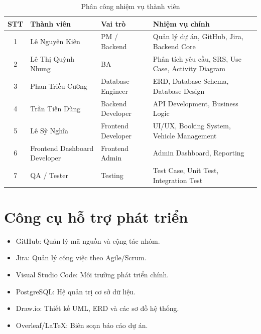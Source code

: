 \begin{table}[H]
\centering
\caption{Phân công nhiệm vụ thành viên}
\label{tab:assignment}
\small
\begin{tabular}{|c|l|l|p{6cm}|}
\hline
\textbf{STT} &
\textbf{Thành viên} &
\textbf{Vai trò} &
\textbf{Nhiệm vụ chính}
\\ \hline

1 &
Lê Nguyên Kiên &
PM / Backend &
Quản lý dự án, GitHub, Jira, Backend Core
\\ \hline

2 &
Lê Thị Quỳnh Nhung &
BA &
Phân tích yêu cầu, SRS, Use Case, Activity Diagram
\\ \hline

3 &
Phan Triều Cường &
Database Engineer &
ERD, Database Schema, Database Design
\\ \hline

4 &
Trần Tiến Dũng &
Backend Developer &
API Development, Business Logic
\\ \hline

5 &
Lê Sỹ Nghĩa &
Frontend Developer &
UI/UX, Booking System, Vehicle Management
\\ \hline

6 &
Frontend Dashboard Developer &
Frontend Admin &
Admin Dashboard, Reporting
\\ \hline

7 &
QA / Tester &
Testing &
Test Case, Unit Test, Integration Test
\\ \hline

\end{tabular}
\end{table}

\section{Công cụ hỗ trợ phát triển}

\begin{itemize}
    \item GitHub: Quản lý mã nguồn và cộng tác nhóm.
    \item Jira: Quản lý công việc theo Agile/Scrum.
    \item Visual Studio Code: Môi trường phát triển chính.
    \item PostgreSQL: Hệ quản trị cơ sở dữ liệu.
    \item Draw.io: Thiết kế UML, ERD và các sơ đồ hệ thống.
    \item Overleaf/LaTeX: Biên soạn báo cáo dự án.
\end{itemize}